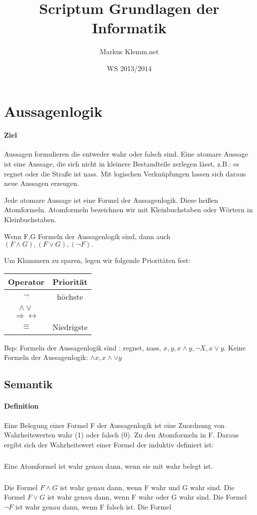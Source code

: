 \documentclass[a4paper]{scrartcl}
\title{Scriptum Grundlagen der Informatik}
\date{WS 2013/2014}
\author{Markus Klemm.net}
\begin{document}
\maketitle
\tableofcontents

\section{Aussagenlogik}

\paragraph{Ziel}
Aussagen formulieren die entweder wahr oder falsch sind. Eine atomare Aussage ist eine Aussage, die sich nicht in kleinere Bestandteile zerlegen lässt, z.B.: es regnet oder die Straße ist nass. Mit logischen Verknüpfungen lassen sich daraus neue Aussagen erzeugen.

Jede atomare Aussage ist eine Formel der Aussagenlogik. Diese heißen Atomformeln. Atomformeln bezeichnen wir mit Kleinbuchstaben oder Wörtern in Kleinbuchstaben.

Wenn F,G Formeln der Aussagenlogik sind, dann auch $(F \wedge G), (F \vee G), (\neg F).$

Um Klammern zu sparen, legen wir folgende Prioritäten fest:

\begin{tabular}{c|c}

Operator & Priorität \\ \hline
$\neg$ & höchste \\
$\wedge \vee$ & \\
$\Rightarrow \leftrightarrow$ & \\
$\equiv$ & Niedrigste \\
\end{tabular}

Bsp: Formeln der Aussagenlogik sind : regnet, nass, $ x, y, x \wedge  y, \neg X, x \vee y $. Keine Formeln der Aussagenlogik: $\wedge x , x \wedge \vee y $

\subsection{Semantik}
\paragraph{Definition}
Eine Belegung einer Formel F der Aussagenlogik ist eine Zuordnung von Wahrheitswerten wahr (1) oder falsch (0). Zu den Atomformeln in F. Daraus ergibt sich der Wahrheitswert einer Formel der induktiv definiert ist:
\subparagraph{}
Eine Atomformel ist wahr genau dann, wenn sie mit wahr belegt ist.
\subparagraph{}
Die Formel $F \wedge G$ ist wahr genau dann, wenn F wahr und G wahr sind.
Die Formel $F \vee G$ ist wahr genau dann, wenn F wahr oder G wahr sind.
Die Formel $\neg F$ ist wahr genau dann, wenn F falsch ist.
Die Formel 
\end{document}
